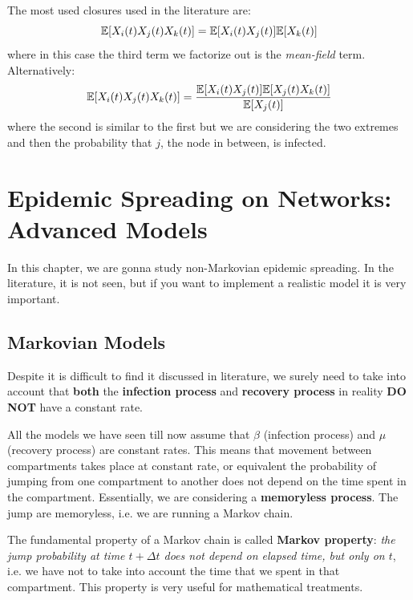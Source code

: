 \documentclass[../main/main.tex]{subfiles}
\begin{document}
The most used closures used in the literature are:
\begin{equation*}
   \mathbb{E} \qty[X_i (t) X_j (t) X_k (t)]   =  \mathbb{E} \qty[X_i (t) X_j (t)]  \mathbb{E}[X_k (t)]
\end{equation*}
where in this case the third term we factorize out is the \textit{mean-field} term. Alternatively:
\begin{equation*}
  \mathbb{E} \qty[X_i (t) X_j (t) X_k (t)]   = \frac{\mathbb{E} \qty[X_i (t) X_j (t)] \mathbb{E}[X_j (t) X_k (t)]  }{\mathbb{E}[X_j (t)]}
\end{equation*}
where the second is similar to the first but we are considering the two extremes and then the probability that \( j \), the node in between, is infected.














\chapter{Epidemic Spreading on Networks: Advanced Models}

In this chapter, we are gonna study non-Markovian epidemic spreading. In the literature, it is not seen, but if you want to implement a realistic model it is very important.

\section{Markovian Models}

Despite it is difficult to find it discussed in literature, we surely need to take into account that \textbf{both} the \textbf{infection process} and \textbf{recovery process} in reality \textbf{DO NOT} have a constant rate.

All the models we have seen till now assume that \( \beta  \) (infection process) and \( \mu  \) (recovery process) are constant rates.
This means that movement between compartments takes place at constant rate, or equivalent the probability of jumping from one compartment to another does not depend on the time spent in the compartment. Essentially, we are considering a \textbf{memoryless process}.
The jump are memoryless, i.e. we are running a Markov chain.

The fundamental property of a Markov chain is called \textbf{Markov property}: \emph{the jump probability at time \( t + \Delta t \) does not depend on elapsed time, but only on \( t \)}, i.e. we have not to take into account the time that we spent in that compartment.
This property is very useful for mathematical treatments.
\end{document}
